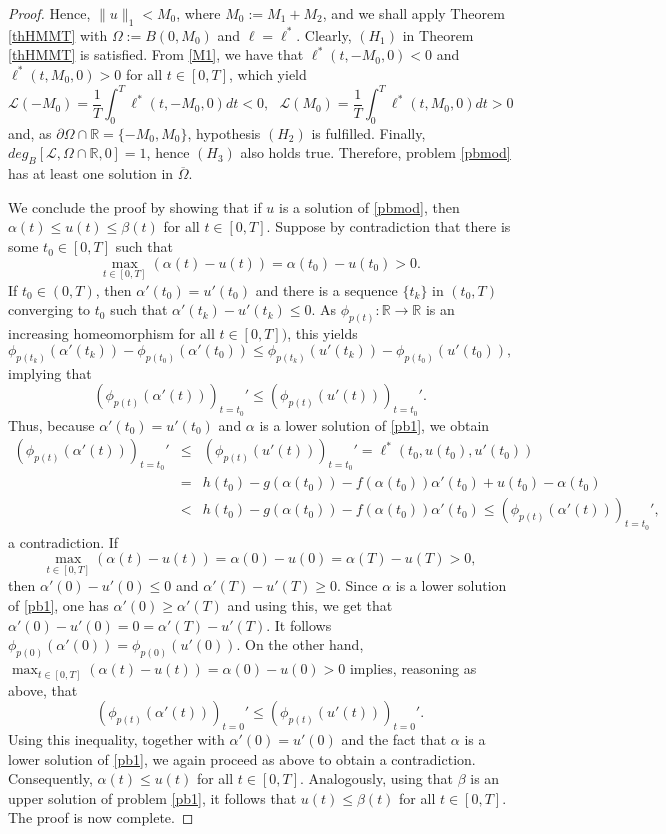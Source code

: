 \documentclass[10pt,a4paper]{amsart}
\begin{document}
\begin{proof}
Hence, $\|u\|_1<M_0$, where $M_0:=M_1+M_2$, and we shall apply Theorem \ref{thHMMT} with $\Omega:=B(0,M_0)$ and $\ell=\ell^*$.
Clearly,  $(H_1)$ in Theorem \ref{thHMMT} is satisfied.
From \eqref{M1}, we have that $\ell^*(t,-M_0,0)<0$ and $\ell^*(t,M_0,0)>0$ for all $t\in [0,T]$, which yield
$$\mathcal{L}(-M_0)=\frac{1}{T}\int_0^T\ell^*(t,-M_0,0)dt<0,\ \ \ \mathcal{L}(M_0)=\frac{1}{T}\int_0^T\ell^*(t,M_0,0)dt>0$$
and, as $\partial \Omega \cap \mathbb{R}=\{ -M_0, M_0 \}$, hypothesis $(H_2)$  is fulfilled. Finally,  $deg_B[\mathcal{L},\Omega\cap\mathbb{R},0]=1$, hence $(H_3)$ also holds true. Therefore, problem \eqref{pbmod} has at least one solution in $\overline{\Omega}$.

We conclude the proof by showing that if $u$ is a solution of \eqref{pbmod}, then $\alpha(t)\leq u(t)\leq\beta(t)$ for all $t\in[0,T]$. Suppose by contradiction that there is some $t_0\in[0,T]$ such that $$\max_{t\in[0,T]}(\alpha(t)-u(t))=\alpha(t_0)-u(t_0)>0.$$
If $t_0\in(0,T)$, then $\alpha'(t_0)=u'(t_0)$ and there is a sequence $\{t_k\}$ in $(t_0, T)$ converging to $t_0$ such that $\alpha'(t_k)-u'(t_k)\leq0$. As $\phi_{p(t)}: \mathbb{R} \to \mathbb{R}$
is an increasing homeomorphism for all $t\in [0,T])$, this yields
$$\phi_{p(t_k)}(\alpha'(t_k))-\phi_{p(t_0)}(\alpha'(t_0))\leq\phi_{p(t_k)}(u'(t_k))-\phi_{p(t_0)}(u'(t_0)),$$
implying that
$$\left(\phi_{p(t)}(\alpha'(t))\right)_{t=t_0}'\leq\left(\phi_{p(t)}(u'(t))\right)_{t=t_0}'.$$
Thus, because $\alpha'(t_0)=u'(t_0)$ and $\alpha$ is a lower solution of \eqref{pb1}, we obtain
\begin{eqnarray*}
  \left(\phi_{p(t)}(\alpha'(t))\right)_{t=t_0}' &\leq& \left(\phi_{p(t)}(u'(t))\right)_{t=t_0}'=\ell^*(t_0,u(t_0),u'(t_0)) \\
  &=& h(t_0)-g(\alpha(t_0))-f(\alpha(t_0))\alpha'(t_0)+u(t_0)-\alpha(t_0)\\
  &<& h(t_0)-g(\alpha(t_0))-f(\alpha(t_0))\alpha'(t_0)\leq \left(\phi_{p(t)}(\alpha'(t))\right)_{t=t_0}',
\end{eqnarray*}
a contradiction. If $$\max_{t\in[0,T]}(\alpha(t)-u(t))=\alpha(0)-u(0)=\alpha(T)-u(T)>0,$$
then $\alpha'(0)-u'(0)\leq0$ and $\alpha'(T)-u'(T)\geq0$. Since $\alpha$ is a lower solution of \eqref{pb1}, one has $\alpha'(0)\geq\alpha'(T)$ and using this, we get that $\alpha'(0)-u'(0)=0=\alpha'(T)-u'(T)$. It follows  $\phi_{p(0)}(\alpha'(0))=\phi_{p(0)}(u'(0))$. On the other hand, $\max_{t\in[0,T]}(\alpha(t)-u(t))=\alpha(0)-u(0)>0$ implies, reasoning as above, that
$$\left(\phi_{p(t)}(\alpha'(t))\right)_{t=0}'\leq\left(\phi_{p(t)}(u'(t))\right)_{t=0}'.$$
Using this inequality, together with $\alpha'(0)=u'(0)$ and the fact that $\alpha$ is a lower solution of \eqref{pb1}, we again proceed as above to obtain a contradiction. Consequently, $\alpha(t)\leq u(t)$ for all $t\in[0,T]$. Analogously, using that $\beta$ is an upper solution of problem \eqref{pb1}, it follows that $u(t)\leq\beta(t)$ for all $t\in[0,T]$. The proof is now complete.
\end{proof}
\end{document}
